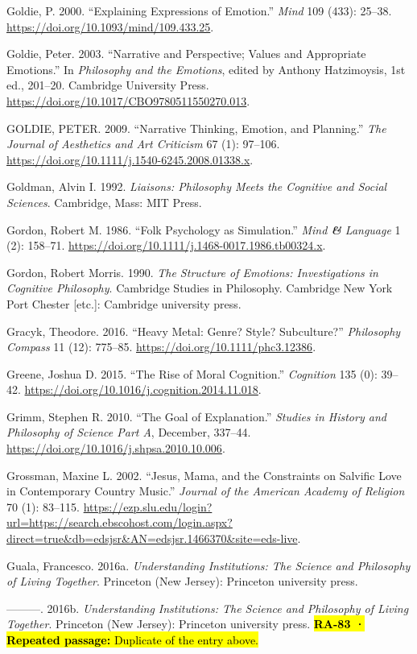\documentclass[
  letterpaper,
  DIV=11,
  numbers=noendperiod]{scrartcl}
\theoremstyle{remark}
\begin{document}
Goldie, P. 2000. ``Explaining Expressions of Emotion.'' \emph{Mind} 109
(433): 25--38. \url{https://doi.org/10.1093/mind/109.433.25}.

Goldie, Peter. 2003. ``Narrative and Perspective; Values and Appropriate
Emotions.'' In \emph{Philosophy and the Emotions}, edited by Anthony
Hatzimoysis, 1st ed., 201--20. Cambridge University Press.
\url{https://doi.org/10.1017/CBO9780511550270.013}.

GOLDIE, PETER. 2009. ``Narrative Thinking, Emotion, and Planning.''
\emph{The Journal of Aesthetics and Art Criticism} 67 (1): 97--106.
\url{https://doi.org/10.1111/j.1540-6245.2008.01338.x}.

Goldman, Alvin I. 1992. \emph{Liaisons: Philosophy Meets the Cognitive
and Social Sciences}. Cambridge, Mass: MIT Press.

Gordon, Robert M. 1986. ``Folk Psychology as Simulation.'' \emph{Mind
\textbf{\&} Language} 1 (2): 158--71.
\url{https://doi.org/10.1111/j.1468-0017.1986.tb00324.x}.

Gordon, Robert Morris. 1990. \emph{The Structure of Emotions:
Investigations in Cognitive Philosophy}. Cambridge Studies in
Philosophy. Cambridge New York Port Chester {[}etc.{]}: Cambridge
university press.

Gracyk, Theodore. 2016. ``Heavy Metal: Genre? Style? Subculture?''
\emph{Philosophy Compass} 11 (12): 775--85.
\url{https://doi.org/10.1111/phc3.12386}.

Greene, Joshua D. 2015. ``The Rise of Moral Cognition.''
\emph{Cognition} 135 (0): 39--42.
\url{https://doi.org/10.1016/j.cognition.2014.11.018}.

Grimm, Stephen R. 2010. ``The Goal of Explanation.'' \emph{Studies in
History and Philosophy of Science Part A}, December, 337--44.
\url{https://doi.org/10.1016/j.shpsa.2010.10.006}.

Grossman, Maxine L. 2002. ``Jesus, Mama, and the Constraints on Salvific
Love in Contemporary Country Music.'' \emph{Journal of the American
Academy of Religion} 70 (1): 83--115.
\url{https://ezp.slu.edu/login?url=https://search.ebscohost.com/login.aspx?direct=true&db=edsjsr&AN=edsjsr.1466370&site=eds-live}.

Guala, Francesco. 2016a. \emph{Understanding Institutions: The Science
and Philosophy of Living Together}. Princeton (New Jersey): Princeton
university press.

---------. 2016b. \emph{Understanding Institutions: The Science and
Philosophy of Living Together}. Princeton (New Jersey): Princeton
university press. \hl{\textbf{RA-83 · Repeated passage:} Duplicate of
the entry above.}
\end{document}
